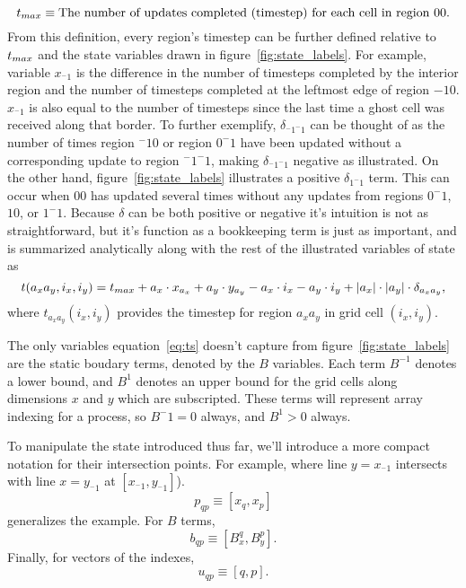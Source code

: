 \begin{equation}
  \text{$t_{max}$} \equiv \text{The number of updates completed (timestep) for each cell in region $00$}.
\end{equation}
From this definition, every region's timestep can be further defined relative to $\text{$t_{max}$}$ and the state
variables drawn in figure~\ref{fig:state_labels}.  For example, variable $x_{^-1}$ is the difference in the
 number of timesteps completed by the interior region and the number of timesteps completed at the leftmost edge
 of region $-10$.  $x_{^-1}$ is also equal to the number of timesteps since the last time a ghost cell was received along
 that border.  To further exemplify, $\delta_{^-1^-1}$ can be thought of as the number of times
region $^-10$ or region $0^-1$ have been updated without a corresponding update to region $^-1^-1$, making $\delta_{^-1^-1}$
negative as illustrated.  On the other hand, figure~\ref{fig:state_labels} illustrates a positive
 $\delta_{1^-1}$ term.  This can occur when $00$ has updated several times without
any updates from regions $0^-1$, $10$, or $1^-1$.  Because $\delta$ can be both positive or negative
it's intuition is not as straightforward, but it's function as a bookkeeping term is just as important, and
is summarized analytically along with the rest of the illustrated variables of state as
\begin{equation}
  t(a_xa_y,i_x,i_y) = \text{$t_{max}$} +
  a_x \cdot x_{a_x} + a_y \cdot y_{a_y} -
  a_x \cdot i_x - a_y \cdot i_y +
  |a_x|\cdot|a_y|\cdot\delta_{a_xa_y},
  \label{eq:ts}
\end{equation}
where $t_{a_xa_y}(i_x,i_y)$ provides the timestep for region $a_xa_y$ in grid cell $(i_x,i_y)$.

The only variables equation~\ref{eq:ts} doesn't capture from figure~\ref{fig:state_labels} are the
static boudary terms, denoted by the $B$ variables.  Each term $B^{-1}$ denotes a lower bound, and $B^1$
denotes an upper bound for the grid cells along dimensions $x$ and $y$ which are subscripted.
  These terms will represent array indexing for a process, so $B^-1 = 0$ always, and $B^1 > 0$ always.

  To manipulate the state introduced thus far, we'll introduce a more compact
  notation for their intersection points.  For example,
  where line $y = x_{^-1}$ intersects with line $x = y_{^-1}$ at $[x_{^-1}, y_{^-1}]$).
  \begin{equation} \label{eq:p_sm}
    p_{qp} \equiv [x_q, x_p]
  \end{equation}
generalizes the example.  For $B$ terms,
\begin{equation}
  b_{qp} \equiv [B_x^q, B_y^p].
  \label{eq:b_sm}
\end{equation}
Finally, for vectors of the indexes,
\begin{equation}
  u_{qp} \equiv [q, p].
  \label{eq:u_sm}
\end{equation}

